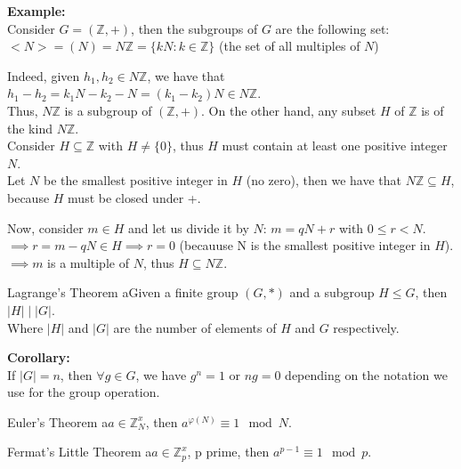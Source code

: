 \medskip

\noindent
\textbf{Example:}\\
Consider $G = (\mathbb{Z}, +)$, then the subgroups of $G$ are the following set:\\
$<N> = (N) = N\mathbb{Z} = \{ kN: k \in \mathbb{Z} \} $ (the set of all multiples of $N$)\\
\smallskip

\noindent
Indeed, given $h_1, h_2 \in N\mathbb{Z}$, we have that $h_1 - h_2 = k_1N - k_2-N = (k_1 - k_2)N \in N \mathbb{Z}$.\\
Thus, $N\mathbb{Z}$ is a subgroup of $(\mathbb{Z}, +)$. On the other hand, any subset $H$ of $\mathbb{Z}$ is of the kind $N\mathbb{Z}$.\\
\smallskip
\noindent
Consider $H \subseteq \mathbb{Z}$ with $H \neq \{0\}$, thus $H$ must contain at least one positive integer $N$.\\
Let $N$ be the smallest positive integer in $H$ (no zero), then we have that $N\mathbb{Z} \subseteq H$, because $H$ must be closed under +.
\smallskip

\noindent
Now, consider $m \in H$ and let us divide it by $N$: $m = qN + r$ with $0 \leq r < N$.\\
$\implies r= m - qN \in H \implies r= 0$ (becauuse N is the smallest positive integer in $H$).\\
$\implies m $ is a multiple of $N$, thus $H \subseteq N\mathbb{Z}$.

\bigskip

\begin{thmBox}{Lagrange's Theorem}
    aGiven a finite group $(G, *)$ and a subgroup $H \leq G$, then $|H| \mid |G|$.\\
    Where $|H|$ and $|G|$ are the number of elements of $H$ and $G$ respectively.
\end{thmBox}

\noindent
\textbf{Corollary:}\\
If $|G| = n$, then $\forall g \in G$, we have $g^n = 1$ or $ng = 0$ depending on the notation we use for the group operation.\\

\begin{thmBox}{Euler's Theorem}
    a$a \in \mathbb{Z}^x_N$, then $a^{\varphi(N)} \equiv 1 \mod N$.
\end{thmBox}

\medskip

\begin{thmBox}{Fermat's Little Theorem}
    a$a \in \mathbb{Z}^x_p$, p prime, then $a^{p-1} \equiv 1 \mod p$.
\end{thmBox}

